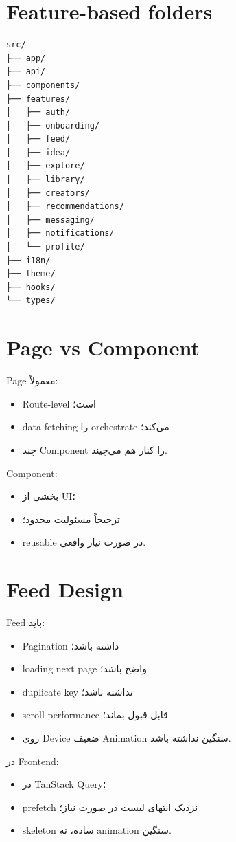 \section{Feature-based folders}

\begin{latin}
\begin{lstlisting}
src/
├── app/
├── api/
├── components/
├── features/
│   ├── auth/
│   ├── onboarding/
│   ├── feed/
│   ├── idea/
│   ├── explore/
│   ├── library/
│   ├── creators/
│   ├── recommendations/
│   ├── messaging/
│   ├── notifications/
│   └── profile/
├── i18n/
├── theme/
├── hooks/
└── types/
\end{lstlisting}
\end{latin}

\section{Page vs Component}

Page معمولاً:
\begin{itemize}
  \item Route-level است؛
  \item data fetching را orchestrate می‌کند؛
  \item چند Component را کنار هم می‌چیند.
\end{itemize}

Component:
\begin{itemize}
  \item بخشی از UI؛
  \item ترجیحاً مسئولیت محدود؛
  \item reusable در صورت نیاز واقعی.
\end{itemize}

\section{Feed Design}

Feed باید:
\begin{itemize}
  \item Pagination داشته باشد؛
  \item loading next page واضح باشد؛
  \item duplicate key نداشته باشد؛
  \item scroll performance قابل قبول بماند؛
  \item روی Device ضعیف Animation سنگین نداشته باشد.
\end{itemize}

در Frontend:
\begin{itemize}
  \item {} در TanStack Query؛
  \item prefetch نزدیک انتهای لیست در صورت نیاز؛
  \item skeleton ساده، نه animation سنگین.
\end{itemize}

